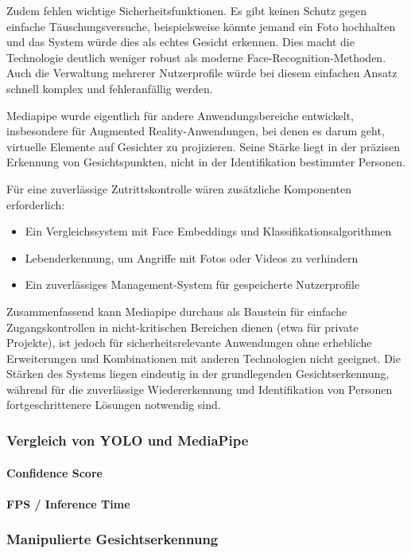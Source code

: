 Zudem fehlen wichtige Sicherheitsfunktionen. Es gibt keinen Schutz gegen einfache Täuschungsversuche, beispielsweise könnte jemand ein Foto hochhalten und das System würde dies als echtes Gesicht erkennen. 
Dies macht die Technologie deutlich weniger robust als moderne Face-Recognition-Methoden. Auch die Verwaltung mehrerer Nutzerprofile würde bei diesem einfachen Ansatz schnell komplex und fehleranfällig werden.

Mediapipe wurde eigentlich für andere Anwendungsbereiche entwickelt, insbesondere für Augmented Reality-Anwendungen, bei denen es darum geht, virtuelle Elemente auf Gesichter zu projizieren. 
Seine Stärke liegt in der präzisen Erkennung von Gesichtspunkten, nicht in der Identifikation bestimmter Personen.

Für eine zuverlässige Zutrittskontrolle wären zusätzliche Komponenten erforderlich:
\begin{itemize}
    \item Ein Vergleichssystem mit Face Embeddings und Klassifikationsalgorithmen
    \item Lebenderkennung, um Angriffe mit Fotos oder Videos zu verhindern
    \item Ein zuverlässiges Management-System für gespeicherte Nutzerprofile
\end{itemize}

Zusammenfassend kann Mediapipe durchaus als Baustein für einfache Zugangskontrollen in nicht-kritischen Bereichen dienen (etwa für private Projekte), ist jedoch für sicherheitsrelevante Anwendungen ohne erhebliche Erweiterungen und Kombinationen mit anderen Technologien nicht geeignet. 
Die Stärken des Systems liegen eindeutig in der grundlegenden Gesichtserkennung, während für die zuverlässige Wiedererkennung und Identifikation von Personen fortgeschrittenere Lösungen notwendig sind.

\subsubsection{Vergleich von YOLO und MediaPipe}
\paragraph{Confidence Score}
\paragraph{FPS / Inference Time}

\subsubsection{Manipulierte Gesichtserkennung}
